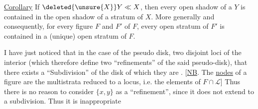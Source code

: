 \uline{Corollary} If $\deleted{\unsure{X}}Y\ll X$, then  every open shadow of a   $Y$ is contained in the open shadow of a stratum of $X$. More generally and consequently, for every figure $F$ and    $F'$ of $F$, every   open stratum of $F'$ is contained in a (unique) open stratum of $F$.

\enspace{}

I have just noticed that in the case of the pseudo disk,  two disjoint loci   of the interior (which therefore define two ``refinements'' of the said pseudo-disk), that there exists a ``Subdivision'' of the disk of which they are . [\uline{NB}. The \uline{nodes} of a figure  are the multistrata  reduced to a locus, i.e. the elements of $F\cap\mathcal L$] Thus  there is no reason to consider $\{x,y\}$ as a ``refinement'', since it does not extend to a subdivision. Thus it is inappropriate
